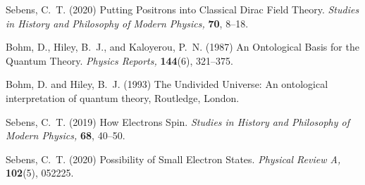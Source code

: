 \documentclass[12pt,onecolumn,secnumarabic,amsmath,amssymb,balancelastpage,nofootinbib]{article}
\begin{document}
\begin{thebibliography}{100}
Sebens, C.~T. (2020)
Putting Positrons into Classical Dirac Field Theory.
{\em Studies in History and Philosophy of Modern Physics,} {\bf 70}, 8--18.

Bohm, D., Hiley, B.~J., and Kaloyerou, P.~N. (1987)
An Ontological Basis for the Quantum Theory.
{\em Physics Reports,} {\bf 144}(6), 321--375.

Bohm, D. and Hiley, B.~J. (1993)
The Undivided Universe: An ontological interpretation of quantum theory,
Routledge, London.

Sebens, C.~T. (2019)
How Electrons Spin.
{\em Studies in History and Philosophy of Modern Physics,} {\bf 68}, 40--50.

Sebens, C.~T. (2020)
Possibility of Small Electron States.
{\em Physical Review A,} {\bf 102}(5), 052225.

\end{thebibliography}
\end{document}
